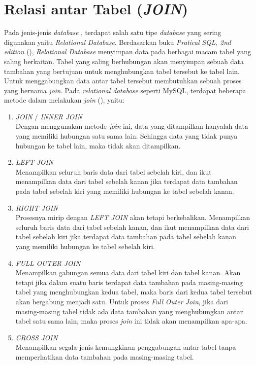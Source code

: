 \section{Relasi antar Tabel (\emph{JOIN})}
Pada jenis-jenis \emph{database} , terdapat salah satu tipe \emph{database} yang sering digunakan yaitu \emph{Relational Database}. Berdasarkan buku 
\emph{Pratical SQL, 2nd edition} (\cite{praticalsql}), \emph{Relational Database} menyimpan data pada berbagai macam tabel yang saling berkaitan. Tabel yang saling berhubungan akan
menyimpan sebuah data tambahan yang bertujuan untuk menghubungkan tabel tersebut ke tabel lain. Untuk menggabungkan data antar tabel tersebut membutuhkan sebuah 
proses yang bernama \emph{join}. Pada \emph{relational database} seperti MySQL, terdapat beberapa metode dalam melakukan \emph{join} (\cite{praticalsql}), yaitu:
\begin{enumerate}
	\item \emph{JOIN} / \emph{INNER JOIN}\\
  Dengan menggunakan metode \emph{join} ini, data yang ditampilkan hanyalah data yang memiliki hubungan satu sama lain. Sehingga data yang tidak punya hubungan ke tabel lain, maka
  tidak akan ditampilkan.
  
	\item \emph{LEFT JOIN} \\
  Menampilkan seluruh baris data dari tabel sebelah kiri, dan ikut menampilkan data dari tabel sebelah kanan jika terdapat data tambahan pada tabel sebelah kiri yang memiliki
  hubungan ke tabel sebelah kanan.

	\item \emph{RIGHT JOIN} \\
  Prosesnya mirip dengan \emph{LEFT JOIN} akan tetapi berkebalikan. Menampilkan seluruh baris data dari tabel sebelah kanan, 
  dan ikut menampilkan data dari tabel sebelah kiri jika terdapat data tambahan pada tabel sebelah kanan yang memiliki
  hubungan ke tabel sebelah kiri.

	\item \emph{FULL OUTER JOIN} \\
  Menampilkan gabungan semua data dari tabel kiri dan tabel kanan. Akan tetapi jika dalam suatu baris terdapat data tambahan pada masing-masing tabel yang menghubungkan
  kedua tabel, maka baris dari kedua tabel tersebut akan bergabung menjadi satu. Untuk proses \emph{Full Outer Join}, jika dari masing-masing tabel tidak ada data tambahan yang
  menghubungkan antar tabel satu sama lain, maka proses \emph{join} ini tidak akan menampilkan apa-apa.

	\item \emph{CROSS JOIN} \\
  Menampilkan segala jenis kemungkinan penggabungan antar tabel tanpa memperhatikan data tambahan pada masing-masing tabel.

\end{enumerate}



